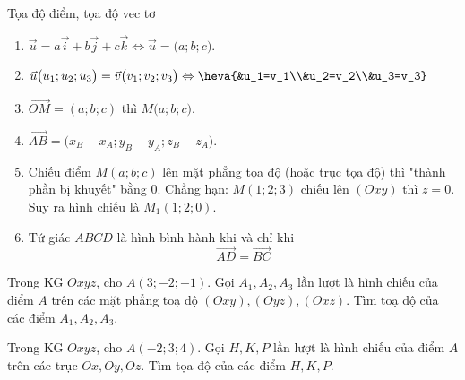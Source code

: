 \begin{dang}{Tọa độ điểm, tọa độ vec tơ}
	\begin{enumerate}
		\item $\vec{u}=a\vec{i}+b\vec{j}+c\vec{k} \Leftrightarrow \vec{u}=\big(a;b;c\big)$.
		\item $\vec{u}\big(u_1;u_2;u_3\big)=\vec{v}\big(v_1;v_2;v_3\big) \Leftrightarrow \heva{&u_1=v_1\\&u_2=v_2\\&u_3=v_3}$
		\item $\vec{OM}=(a;b;c)$ thì $M\big(a;b;c\big)$.
		\item $\vec{AB}=\big(x_B-x_A;y_B-y_A;z_B-z_A \big).$
		\item Chiếu điểm $M(a;b;c)$ lên mặt phẳng tọa độ (hoặc trục tọa độ) thì "thành phần bị khuyết" bằng $0$. Chẳng hạn: $M(1;2;3)$ chiếu lên $(Oxy)$ thì $z=0$. Suy ra hình chiếu là $M_1(1;2;0)$.
		\item Tứ giác $ABCD$ là hình bình hành khi và chỉ khi $$\vec{AD}=\vec{BC}$$
	\end{enumerate}
\end{dang}
\BTTL
\begin{vd}
	Trong KG $Oxyz$, cho $A(3 ;-2 ;-1)$. Gọi $ A_1, A_2, A_3$ lần lượt là hình chiếu của điểm $A$ trên các mặt phẳng toạ độ $(Oxy),(Oyz),(Oxz)$. Tìm toạ độ của các điểm $ A_1, A_2, A_3$.
\end{vd}

\begin{vd}
	Trong KG $Oxyz$, cho $A(-2;3;4)$. Gọi $H, K, P$ lần lượt là hình chiếu của điểm $A$ trên các trục $Ox, Oy, Oz$. Tìm tọa độ của các điểm $H,K,P$.
\end{vd}

